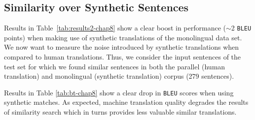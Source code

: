 \begin{table}[h!]
\begin{center}
\end{center}
  \caption{Differences of token average log probability between  and  model.}
  \label{tab:probabilities-chap8}
\end{table}

\subsection*{Similarity over Synthetic Sentences}

Results in Table~\ref{tab:results2-chap8} show a clear boost in performance ($\sim$2 \texttt{BLEU} points) when making use of synthetic translations of the  monolingual data set.
We now want to measure the noise introduced by synthetic translations when compared to human translations.
Thus, we consider the input sentences of the  test set for which we found similar sentences in both the parallel (human translation) and monolingual (synthetic translation) corpus (279 sentences).

Results in Table \ref{tab:bt-chap8} show a clear drop in \texttt{BLEU} scores when using synthetic matches.
As expected, machine translation quality degrades the results of similarity search which in turns provides less valuable similar translations.

\begin{table}[h!]
\begin{center}
\end{center}
  \caption{Results for a reduced test set (279 sentences) using  when priming with human and synthetic (back-translated) translations.}
  \label{tab:bt-chap8}
\end{table}

